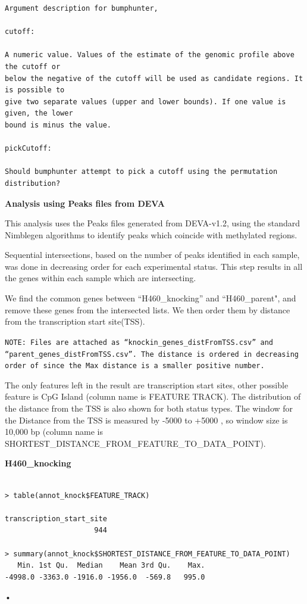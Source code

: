 \documentclass[11pt]{article}
\begin{document}
\begin{verbatim}
Argument description for bumphunter,

cutoff: 

A numeric value. Values of the estimate of the genomic profile above the cutoff or
below the negative of the cutoff will be used as candidate regions. It is possible to
give two separate values (upper and lower bounds). If one value is given, the lower
bound is minus the value.

pickCutoff: 

Should bumphunter attempt to pick a cutoff using the permutation
distribution?

\end{verbatim}

\vspace{0.2in}

{\bf Analysis using Peaks files from DEVA}

This analysis uses the Peaks files generated from DEVA-v1.2, using the standard Nimblegen algorithms to identify peaks which coincide with methylated regions.

Sequential intersections, based on the number of peaks identified in each sample, was done in decreasing order for each experimental status. This step results in all the genes within each sample which are intersecting.

We find the common genes between “H460\_knocking” and “H460\_parent", and remove these genes from the intersected lists. We then order them by distance from the transcription start site(TSS).

{\tt NOTE:  Files are attached as “knockin\_genes\_distFromTSS.csv” and “parent\_genes\_distFromTSS.csv”. The distance is ordered in decreasing order of since the Max distance is a smaller positive number.}

The only features left in the result are transcription start sites, other possible feature is CpG Island (column name  is  FEATURE TRACK). The distribution of the distance from the TSS is also shown for both status types. The window for the Distance from the TSS is measured by  -5000 to +5000 , so window size is 10,000 bp (column name is SHORTEST\_DISTANCE\_FROM\_FEATURE\_TO\_DATA\_POINT).


{\bf H460\_knocking}

\begin{verbatim}

> table(annot_knock$FEATURE_TRACK)

transcription_start_site 
                     944 

> summary(annot_knock$SHORTEST_DISTANCE_FROM_FEATURE_TO_DATA_POINT)
   Min. 1st Qu.  Median    Mean 3rd Qu.    Max. 
-4998.0 -3363.0 -1916.0 -1956.0  -569.8   995.0 

\end{verbatim}•
\end{document}
